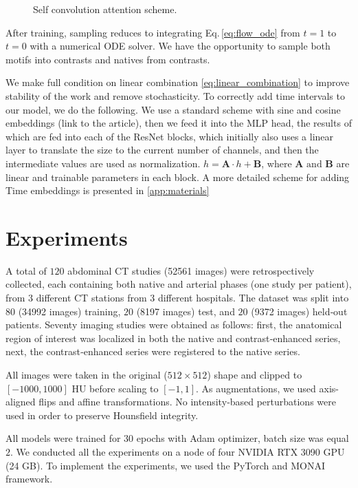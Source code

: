 \documentclass{article}
\begin{document}
\begin{figure}[h!]
  \centering
  \caption{Self convolution attention scheme.}
\end{figure}

After training, sampling reduces to integrating
Eq.\,\eqref{eq:flow_ode} from $t=1$ to $t=0$ with a numerical ODE solver. We have the opportunity to sample both motifs into contrasts and natives from contrasts.


We make full condition on linear combination \eqref{eq:linear_combination} to improve stability of the work and remove stochasticity. To correctly add time intervals to our model, we do the following. We use a standard scheme with sine and cosine embeddings (link to the article), then we feed it into the MLP head, the results of which are fed into each of the ResNet blocks, which initially also uses a linear layer to translate the size to the current number of channels, and then the intermediate values are used as normalization. $h = \textbf{A} \cdot h + \textbf{B}$, where $\textbf{A} \text{ and } \textbf{B}$ are linear and trainable parameters in each block. A more detailed scheme for adding Time embeddings is presented in \ref{app:materials}

\section{Experiments}
A total of $120$ abdominal CT studies (52561 images) were retrospectively collected, each containing both native and arterial phases (one study per patient), from 3 different CT stations from 3 different hospitals. The dataset was split into $80$ (34992 images) training, $20$ (8197 images) test, and $20$ (9372 images) held‑out patients. Seventy imaging studies were obtained as follows: first, the anatomical region of interest was localized in both the native and contrast‐enhanced series, next, the contrast‐enhanced series were registered to the native series.

All images were taken in the original ($512{\times}512$) shape and clipped to  $[-1000,1000]$ HU before scaling to $[-1, 1]$. As augmentations, we used axis-aligned flips and affine transformations. No intensity‑based perturbations were used in order to preserve Hounsfield integrity.

All models were trained for $30$ epochs with Adam optimizer, batch size was equal $2$. We conducted all the experiments on a node of four NVIDIA RTX 3090 GPU (24 GB). To implement the experiments, we used the PyTorch \citep{paszke2019pytorch} and MONAI framework. 
\end{document}
